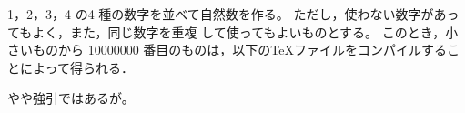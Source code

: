 \documentclass[autodetect-engine]{jsarticle}
\begin{document}
1，2，3，4 の4 種の数字を並べて自然数を作る。
ただし，使わない数字があってもよく，また，同じ数字を重複
して使ってもよいものとする。
このとき，小さいものから 10000000 番目のものは，以下の\TeX ファイルをコンパイルすることによって得られる．


やや強引ではあるが。
\end{document}
